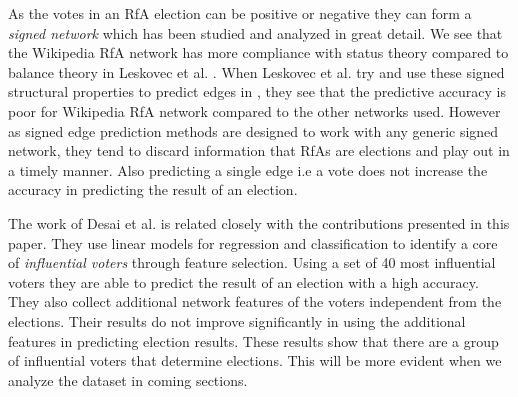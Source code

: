 As the votes in an RfA election can be positive or negative they can form a \textit{signed network} which has been studied and analyzed in great detail. We see that the Wikipedia RfA network has more compliance with status theory compared to balance theory in Leskovec et al. \cite{leskovecSigned}. When Leskovec et al. try and use these signed structural properties to predict edges in \cite{leskovecPredicting}, they see that the predictive accuracy is poor for Wikipedia RfA network compared to the other networks used. However as signed edge prediction methods are designed to work with any generic signed network, they tend to discard information that RfAs are elections and play out in a timely manner. Also predicting a single edge i.e a vote does not increase the accuracy in predicting the result of an election.   

The work of Desai et al. \cite{desai2014result} is related closely with the contributions presented in this paper. They use linear models for regression and classification to identify a core of \textit{influential voters} through feature selection. Using a set of 40 most influential voters they are able to predict the result of an election with a high accuracy. They also collect additional network features of the voters independent from the elections. Their results do not improve significantly in using the additional features in predicting election results. These results show that there are a group of influential voters that determine elections. This will be more evident when we analyze the dataset in coming sections.
